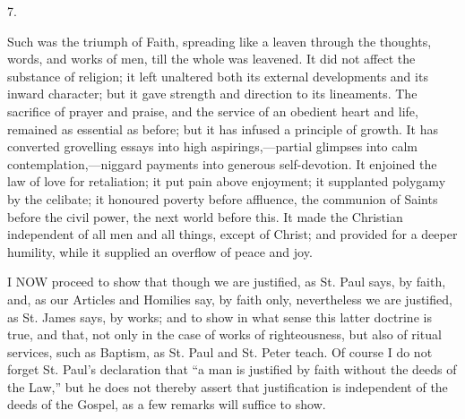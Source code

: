 7.

Such was the triumph of Faith, spreading like a leaven through the
thoughts, words, and works of men, till the whole was leavened. It did
not affect the substance of religion; it left unaltered both its
external developments and its inward character; but it gave strength
and direction to its lineaments. The sacrifice of prayer and praise,
and the service of an obedient heart and life, remained as essential
as before; but it has infused a principle of growth. It has converted
grovelling essays into high aspirings,—partial glimpses into calm
contemplation,—niggard payments into generous self-devotion. It
enjoined the law of love for retaliation; it put pain above enjoyment;
it supplanted polygamy by the celibate; it honoured poverty before
affluence, the communion of Saints before the civil power, the next
world before this. It made the Christian independent of all men and
all things, except of Christ; and provided for a deeper humility,
while it supplied an overflow of peace and joy.


I NOW proceed to show that though we are justified, as St.
Paul says, by faith, and, as our Articles and Homilies say, by faith
only, nevertheless we are justified, as St. James says, by works; and
to show in what sense this latter doctrine is true, and that, not only
in the case of works of righteousness, but also of ritual services,
such as Baptism, as St. Paul and St. Peter teach. Of course I do not
forget St. Paul's declaration that ``a man is justified by faith
without the deeds of the Law,'' but he does not thereby assert
that justification is independent of the deeds of the Gospel, as a few
remarks will suffice to show.

